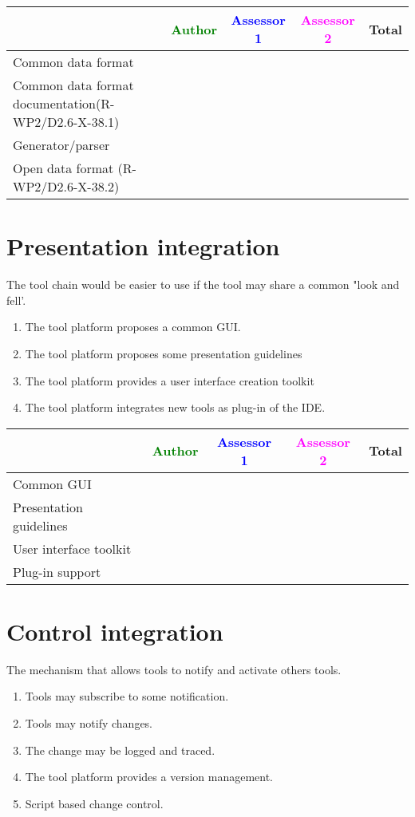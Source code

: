 \begin{tabular}{|l | c | c | c | c|} \hline
  & \textcolor{green}{Author} & \textcolor{blue}{Assessor 1} &  \textcolor{magenta}{Assessor 2} & Total \\
  \hline Common data format&
  &                 &                  &\\
  \hline Common data format documentation(R-WP2/D2.6-X-38.1) &
  &                 &                  &\\
  \hline Generator/parser &
  &                 &                  &\\
  \hline Open data format (R-WP2/D2.6-X-38.2)&
  &                 &                  &\\
  \hline
\end{tabular}



\section{Presentation integration}
The tool chain would be easier to use if the tool may share a common
"look and fell'.
\begin{enumerate}
\item The tool platform proposes a common \gls{GUI}.
\item The tool platform proposes some presentation guidelines
\item The tool platform provides a user interface creation toolkit
\item The tool platform integrates new tools as plug-in of the \gls{IDE}.
\end{enumerate}

\begin{tabular}{|l | c | c | c | c|} \hline
  & \textcolor{green}{Author} & \textcolor{blue}{Assessor 1} &  \textcolor{magenta}{Assessor 2} & Total \\
  \hline Common \gls{GUI}&
  &                 &                  &\\
  \hline Presentation guidelines &
  &                 &                  &\\
  \hline User interface toolkit &
  &                 &                  &\\
  \hline Plug-in support &
  &                 &                  &\\
  \hline
\end{tabular}


\section{Control integration}
The mechanism that allows tools to notify and activate others tools.
\begin{enumerate}
\item Tools may subscribe to some notification.
\item Tools may notify changes.
\item The change may be logged and traced.
\item The tool platform provides a version management.
\item Script based change control.
\end{enumerate}

